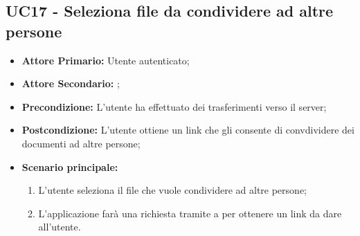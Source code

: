 \subsection{UC17 - Seleziona file da condividere ad altre persone}
\label{UC17}
\begin{itemize}
\item \textbf{Attore Primario:} Utente autenticato;
\item \textbf{Attore Secondario:} ;
\item \textbf{Precondizione:} L'utente ha effettuato dei trasferimenti verso il server;
\item \textbf{Postcondizione:} L'utente ottiene un link che gli consente di convdividere dei documenti ad altre persone;
\item \textbf{Scenario principale:}
    \begin{enumerate}
    \item L'utente seleziona il file che vuole condividere ad altre persone;
    \item L'applicazione farà una richiesta tramite  a  per ottenere un link da dare all'utente.
    \end{enumerate}
\end{itemize}